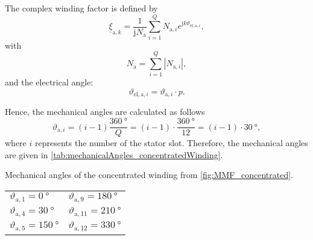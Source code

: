 \begin{solutionblock}
    The complex winding factor is defined by
    \begin{equation}
        \underline{\xi}_{\mathrm{a,}k} = \frac{1}{\mathrm{j}N_{\mathrm{a}}} \sum_{i=1}^{Q} N_{\mathrm{a,}i}e^{\mathrm{j}k\vartheta_{\mathrm{el,a,}i}},
        \label{eq:complexWindingFactor_concentratedWinding}
    \end{equation}
    with
    \begin{equation}
        N_{\mathrm{a}} = \sum_{i=1}^{Q} |N_{\mathrm{a,}i} |,
    \end{equation}
    and the electrical angle:
    \begin{equation}
        \vartheta_{\mathrm{el,a,}i} = \vartheta_{\mathrm{a,}i} \cdot p.
    \end{equation}
    
    Hence, the mechanical angles are calculated as follows
    \begin{equation}
        \vartheta_{\mathrm{a,}i} = \left(i-1 \right) \frac{\SI{360}{\degree}}{Q}
        = \left(i-1 \right) \cdot \frac{\SI{360}{\degree}}{12}
        = \left(i-1 \right)\cdot \SI{30}{\degree},
    \end{equation}
    where $i$ represents the number of the stator slot.
    Therefore, the mechanical angles are given in \autoref{tab:mechanicalAngles_concentratedWinding}.
    \begin{solutiontable}[ht]
        \caption{Mechanical angles of the concentrated winding from \autoref{fig:MMF_concentrated}.}
        \centering
        \begin{tabular}{C{3cm}|C{3cm}}\toprule
            $\vartheta_{\mathrm{a,}1} = \SI{0}{\degree}$     & $\vartheta_{\mathrm{a,}9} = \SI{180}{\degree}$ \\
            $\vartheta_{\mathrm{a,}4} = \SI{30}{\degree}$    & $\vartheta_{\mathrm{a,}11} = \SI{210}{\degree}$ \\
            $\vartheta_{\mathrm{a,}5} = \SI{150}{\degree}$    & $\vartheta_{\mathrm{a,}12} = \SI{330}{\degree}$ \\
            \bottomrule
        \end{tabular}
        \label{tab:mechanicalAngles_concentratedWinding}
    \end{solutiontable}


\end{solutionblock}
